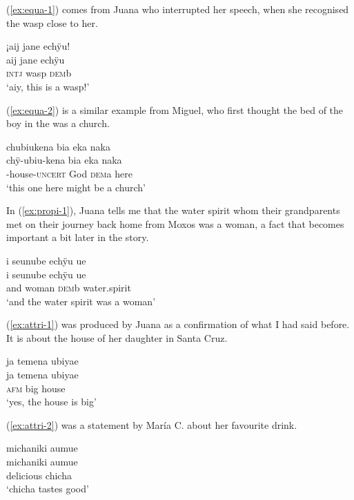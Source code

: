 (\ref{ex:equa-1}) comes from Juana who interrupted her speech, when she recognised the wasp close to her.

\ea\label{ex:equa-1}
\begingl
\glpreamble ¡aij jane echÿu!\\
\gla aij jane echÿu\\
\glb \textsc{intj} wasp \textsc{dem}b\\
\glft ‘aiy, this is a wasp!’
\endgl
\trailingcitation{[jxx-p120430l-2.478]}
\xe

(\ref{ex:equa-2}) is a similar example from Miguel, who first thought the bed of the boy in the  was a church.

\ea\label{ex:equa-2}
\begingl
\glpreamble chubiukena bia eka naka\\
\gla chÿ-ubiu-kena bia eka naka\\
-house-\textsc{uncert} God \textsc{dem}a here\\
\glft ‘this one here might be a church’
\endgl
\trailingcitation{[mox-a110920l-2.019]}
\xe

In (\ref{ex:propi-1}), Juana tells me that the water spirit whom their grandparents met on their journey back home from Moxos was a woman, a fact that becomes important a bit later in the story.

\ea\label{ex:propi-1}
\begingl
\glpreamble i seunube echÿu ue\\
\gla i seunube echÿu ue\\
\glb and woman \textsc{dem}b water.spirit\\
\glft ‘and the water spirit was a woman’
\endgl
\trailingcitation{[jxx-p151016l-2.157]}
\xe
{}

(\ref{ex:attri-1}) was produced by Juana as a confirmation of what I had said before. It is about the house of her daughter in Santa Cruz.

\ea\label{ex:attri-1}
\begingl
\glpreamble ja temena ubiyae\\
\gla ja temena ubiyae\\
\glb \textsc{afm} big house\\
\glft ‘yes, the house is big’
\endgl
\trailingcitation{[jxx-p120430l-1.414]}
\xe

(\ref{ex:attri-2}) was a statement by María C. about her favourite drink.

\ea\label{ex:attri-2}
\begingl
\glpreamble michaniki aumue\\
\gla michaniki aumue\\
\glb delicious chicha\\
\glft ‘chicha tastes good’
\endgl
\trailingcitation{[uxx-p110825l.257]}
\xe
{}

